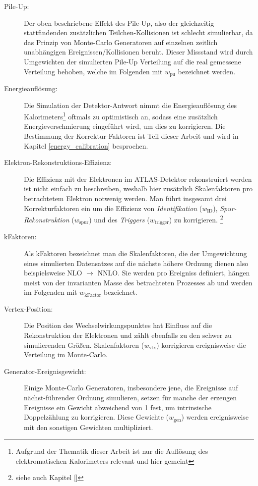 \begin{description}
    \item[Pile-Up:] Der oben beschriebene Effekt des Pile-Up, also der
        gleichzeitig stattfindenden zusätzlichen Teilchen-Kollisionen ist
        schlecht simulierbar, da das Prinzip von Monte-Carlo Generatoren auf
        einzelnen zeitlich unabhängigen Ereignissen/Kollisionen beruht. Dieser
        Missstand wird durch Umgewichten der simulierten Pile-Up Verteilung auf
        die real gemessene Verteilung behoben, welche im Folgenden mit
        $w_\text{pu}$ bezeichnet werden.
    \item[Energieauflösung:] Die Simulation der Detektor-Antwort nimmt die
        Energieauflösung des Kalorimeters\footnote{Aufgrund der Thematik dieser
        Arbeit ist nur die Auflösung des elektromatischen Kalorimeters relevant
        und hier gemeint} oftmals zu optimistisch an, sodass eine zusätzlich
        Energieverschmierung eingeführt wird, um dies zu korrigieren. Die
        Bestimmung der Korrektur-Faktoren ist Teil dieser Arbeit und wird in
        Kapitel \ref{energy_calibration} besprochen.
    \item[Elektron-Rekonstruktions-Effizienz:] Die Effizienz mit der Elektronen
        im ATLAS-Detektor rekonstruiert werden ist nicht einfach zu
        beschreiben, weshalb hier zusätzlich Skalenfaktoren pro betrachtetem
        Elektron notwenig werden. Man führt insgesamt drei Korrekturfaktoren
        ein um die Effizienz von \textit{Identifikation} ($w_\text{ID}$),
        \textit{Spur-Rekonstruktion} ($w_\text{spur}$) und des
        \textit{Triggers} ($w_\text{trigger}$) zu korrigieren.
        \footnote{siehe auch Kapitel \ref{}}
    \item[kFaktoren:] Als kFaktoren bezeichnet man die Skalenfaktoren, die der
        Umgewichtung eines simulierten Datensatzes auf die nächste höhere
        Ordnung dienen also beispielsweise NLO $\rightarrow$ NNLO. Sie werden
        pro Ereigniss definiert, hängen meist von der invarianten Masse des
        betrachteten Prozesses ab und werden im Folgenden mit
        $w_\text{kFactor}$ bezeichnet.
    \item[Vertex-Position:] Die Position des Wechselwirkungspunktes hat
        Einfluss auf die Rekonstruktion der Elektronen und zählt ebenfalls zu
        den schwer zu simulierenden Größen. Skalenfaktoren ($w_\text{vtx}$)
        korrigieren ereignisweise die Verteilung im Monte-Carlo.
    \item[Generator-Ereignisgewicht:] Einige Monte-Carlo Generatoren,
        insbesondere jene, die Ereignisse auf nächst-führender Ordnung
        simulieren, setzen für manche der erzeugen Ereignisse ein Gewicht
        abweichend von 1 fest, um intrinsische Doppelzählung zu korrigieren.
        Diese Gewichte ($w_\text{gen}$) werden ereignisweise mit den sonstigen
        Gewichten multipliziert.
\end{description}


